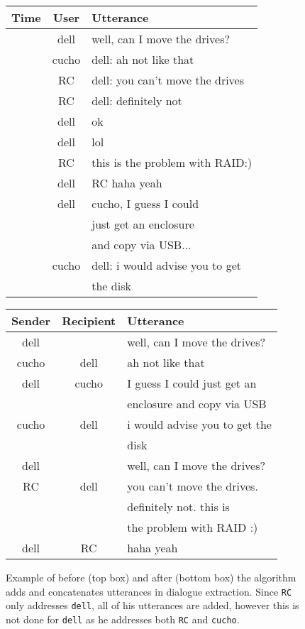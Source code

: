 \documentclass[11pt,a4paper]{article}
\begin{document}
\begin{figure}[h!]
\centering
\scriptsize
\begin{tabular}{|c |c |l|} \hline
Time & User & Utterance \\ \hline \hline
[12:21] & dell & well, can I move the drives? \\ \hline
[12:21] &cucho& dell: ah not like that \\ \hline 
[12:21] &RC& dell: you can't move the drives \\ \hline 
[12:21] &RC& dell: definitely not\\ \hline 
[12:21] &dell &ok\\ \hline 
[12:21] &dell& lol\\ \hline 
[12:21] &RC &this is the problem with RAID:)\\ \hline 
[12:21] &dell & RC haha yeah \\ \hline
[12:22] &dell& cucho, I guess I could \\ &&just get   an enclosure \\ && and copy via USB...\\ \hline 
[12:22] &cucho& dell: i would advise you to get\\&& the disk\\ \hline 
\end{tabular}
\begin{tabular}{|c |c |l|} \hline
Sender & Recipient & Utterance \\ \hline \hline
dell & & well, can I move the drives? \\ \hline 
cucho& dell & ah not like that \\ \hline
dell & cucho & I guess I could just get an \\ && enclosure and copy via USB \\ \hline
cucho & dell & i would advise you to get the \\&& disk \\ \hline \hline
dell & & well, can I move the drives? \\ \hline 
RC & dell & you can't move the drives. \\&& definitely not. this is \\&& the problem with RAID :) \\ \hline
dell & RC & haha yeah \\ \hline
\end{tabular}
\caption{\label{fig:convo2}Example of before (top box) and after (bottom box) the algorithm adds and concatenates utterances in dialogue extraction. Since \texttt{RC} only addresses \texttt{dell}, all of his utterances are added, however this is not done for \texttt{dell} as he addresses both \texttt{RC} and \texttt{cucho}. }
\end{figure}
\end{document}
